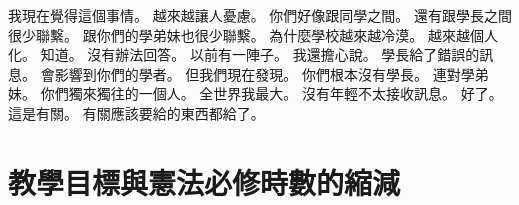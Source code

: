 \hypertarget{c01:cue:520}{}我現在覺得這個事情。
\hypertarget{c01:cue:521}{}越來越讓人憂慮。
\hypertarget{c01:cue:522}{}你們好像跟同學之間。
\hypertarget{c01:cue:523}{}還有跟學長之間很少聯繫。
\hypertarget{c01:cue:524}{}跟你們的學弟妹也很少聯繫。
\hypertarget{c01:cue:525}{}為什麼學校越來越冷漠。
\hypertarget{c01:cue:526}{}越來越個人化。
\hypertarget{c01:cue:527}{}知道。
\hypertarget{c01:cue:528}{}沒有辦法回答。
\hypertarget{c01:cue:529}{}以前有一陣子。
\hypertarget{c01:cue:530}{}我還擔心說。
\hypertarget{c01:cue:531}{}學長給了錯誤的訊息。
\hypertarget{c01:cue:532}{}會影響到你們的學者。
\hypertarget{c01:cue:533}{}但我們現在發現。
\hypertarget{c01:cue:534}{}你們根本沒有學長。
\hypertarget{c01:cue:535}{}連對學弟妹。
\hypertarget{c01:cue:536}{}你們獨來獨往的一個人。
\hypertarget{c01:cue:537}{}全世界我最大。
\hypertarget{c01:cue:538}{}沒有年輕不太接收訊息。
\hypertarget{c01:cue:539}{}好了。
\hypertarget{c01:cue:540}{}這是有關。
\hypertarget{c01:cue:541}{}有關應該要給的東西都給了。

\section{教學目標與憲法必修時數的縮減}

